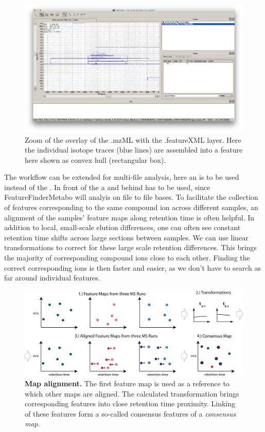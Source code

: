 \begin{figure}[htbp]
  \centering
  \includegraphics[width=\textwidth]{graphics/metabo/ToppView_4.png}
  \caption{Zoom of the overlay of the .mzML with the .featureXML layer. Here the individual isotope traces (blue lines) are assembled into a feature here shown as convex hull (rectangular box).}
  \label{fig:ToppView_4}
\end{figure}

The workflow can be extended for multi-file analysis, here an  is to be used instead of the .  In front of the  a  and behind  has to be used, since FeatureFinderMetabo will analyis on file to file bases. 
\newline
To facilitate the collection of features corresponding to the same compound ion across different samples, an alignment of the samples' feature maps along retention time is often helpful. In addition to local, small-scale elution differences, one can often see constant retention time shifts across large sections between samples. We can use linear transformations to correct for these large scale retention differences. This  brings the majority of corresponding compound ions close to each other. Finding the correct corresponding ions is then faster and easier, as we don't have to search as far around individual features.

\begin{figure}[!htbp]
	\centering
	\includegraphics[width=\textwidth]{graphics/metabo/align.png}
	\caption[Map alignment]
	{
	\textbf{Map alignment.} The first feature map is used as a reference to which other maps are aligned. The calculated transformation brings corresponding features into close retention time proximity. Linking of these features form a so-called consensus features of a \textit{consensus map}.
	}
	\label{bg_alignment}
\end{figure}

